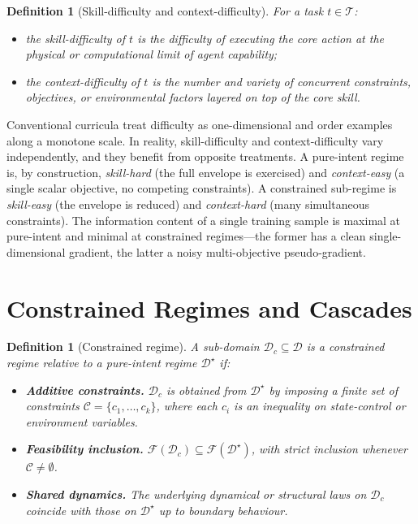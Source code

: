 \documentclass[twocolumn,11pt,a4paper]{article}
\newtheorem{definition}[theorem]{Definition}
\newcommand{\cD}{\mathcal{D}}
\newcommand{\cF}{\mathcal{F}}
\newcommand{\cT}{\mathcal{T}}
\newcommand{\cC}{\mathcal{C}}
\begin{document}
\begin{definition}[Skill-difficulty and context-difficulty]
\label{def:two-axes}
For a task $t \in \cT$:
\begin{itemize}[leftmargin=*,itemsep=1pt]
\item the \emph{skill-difficulty} of $t$ is the difficulty of executing the core action at the physical or computational limit of agent capability;
\item the \emph{context-difficulty} of $t$ is the number and variety of concurrent constraints, objectives, or environmental factors layered on top of the core skill.
\end{itemize}
\end{definition}

Conventional curricula treat difficulty as one-dimensional and order examples along a monotone scale. In reality, skill-difficulty and context-difficulty vary independently, and they benefit from opposite treatments. A pure-intent regime is, by construction, \emph{skill-hard} (the full envelope is exercised) and \emph{context-easy} (a single scalar objective, no competing constraints). A constrained sub-regime is \emph{skill-easy} (the envelope is reduced) and \emph{context-hard} (many simultaneous constraints). The information content of a single training sample is maximal at pure-intent and minimal at constrained regimes---the former has a clean single-dimensional gradient, the latter a noisy multi-objective pseudo-gradient.


\section{Constrained Regimes and Cascades}
\label{sec:cascades}

\begin{definition}[Constrained regime]
\label{def:constrained-regime}
A sub-domain $\cD_c \subseteq \cD$ is a \emph{constrained regime} relative to a pure-intent regime $\cD^\star$ if:
\begin{itemize}[leftmargin=*,itemsep=1pt]
\item[(C1)] \textbf{Additive constraints.} $\cD_c$ is obtained from $\cD^\star$ by imposing a finite set of constraints $\cC = \{c_1, \ldots, c_k\}$, where each $c_i$ is an inequality on state-control or environment variables.
\item[(C2)] \textbf{Feasibility inclusion.} $\cF(\cD_c) \subseteq \cF(\cD^\star)$, with strict inclusion whenever $\cC \neq \emptyset$.
\item[(C3)] \textbf{Shared dynamics.} The underlying dynamical or structural laws on $\cD_c$ coincide with those on $\cD^\star$ up to boundary behaviour.
\end{itemize}
\end{definition}
\end{document}
